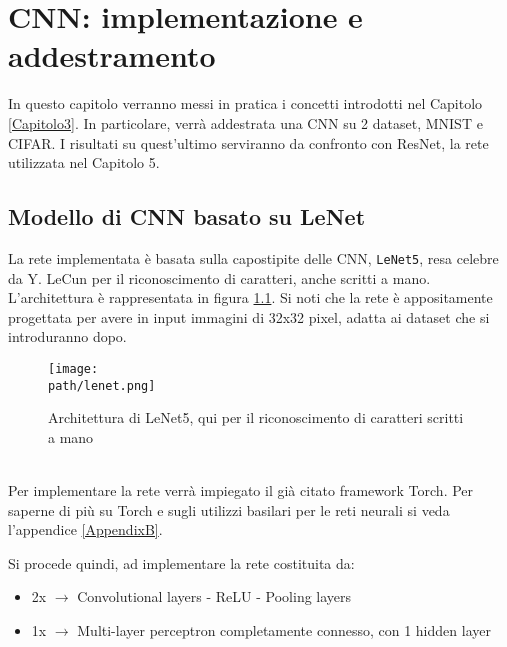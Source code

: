 \chapter{CNN: implementazione e addestramento} %
\label{Capitolo4}
\def \path	{Figures/C4}
In questo capitolo verranno messi in pratica i concetti introdotti nel Capitolo \ref{Capitolo3}. In particolare, verrà addestrata una CNN su 2 dataset, MNIST e CIFAR. I risultati su quest'ultimo serviranno da confronto con ResNet, la rete utilizzata nel Capitolo 5. 
\section{Modello di CNN basato su LeNet}
La rete implementata è basata sulla capostipite delle CNN, \texttt{LeNet5}, resa celebre da Y. LeCun per il riconoscimento di caratteri, anche scritti a mano\parencite{lenet}.  L'architettura è rappresentata in figura \ref{fig:lenet}. Si noti che la rete è appositamente progettata per avere in input immagini di 32x32 pixel, adatta ai dataset che si introduranno dopo. 
\begin{figure}[h!]
 \centering
 \texttt{[image: \\path/lenet.png]} 
 \caption{Architettura di LeNet5, qui per il riconoscimento di caratteri scritti a mano}
 \label{fig:lenet}
\end{figure}	\\
Per implementare la rete verrà impiegato il già citato framework Torch. Per saperne di più su Torch e sugli utilizzi basilari per le reti neurali si veda l'appendice \ref{AppendixB}.

Si procede quindi, ad implementare la rete costituita da: 
\begin{itemize}
\item 2x $\rightarrow$ Convolutional layers - ReLU - Pooling layers
\item 1x $\rightarrow$ Multi-layer perceptron completamente connesso, con 1 hidden layer 
\end{itemize}


